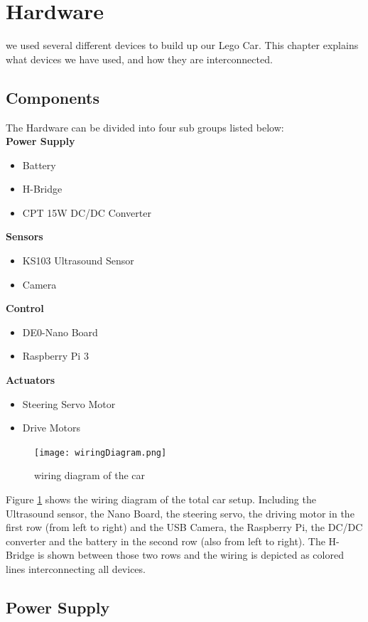 \documentclass[11pt,twocolumn]{article}
\begin{document}
\section{Hardware}
we used several different devices to build up our Lego Car. This chapter explains what devices we have used, and how they are interconnected.
\subsection{Components}
The Hardware can be divided into four sub groups listed below:\\
\newpage
\textbf{Power Supply}
\begin{itemize}
	\item Battery
	\item H-Bridge
	\item CPT 15W DC/DC Converter
\end{itemize}
\textbf{Sensors}
\begin{itemize}
	\item KS103 Ultrasound Sensor
	\item Camera
\end{itemize}
\textbf{Control}
\begin{itemize}
	\item DE0-Nano Board
	\item Raspberry Pi 3 
\end{itemize}
\textbf{Actuators}
\begin{itemize}
	\item Steering Servo Motor
	\item Drive Motors
\end{itemize}
\begin{figure}[h]
\centering
\texttt{[image: wiringDiagram.png]}
\caption{wiring diagram of the car}
\label{wiringDiagram}
\end{figure}
Figure \ref{wiringDiagram} shows the wiring diagram of the total car setup. Including the Ultrasound sensor, the Nano Board, the steering servo, the driving motor in the first row (from left to right) and the USB Camera, the Raspberry Pi, the DC/DC converter and the battery in the second row (also from left to right). The H-Bridge is shown between those two rows and the wiring is depicted as colored lines interconnecting all devices.


\subsection{Power Supply}
\end{document}
